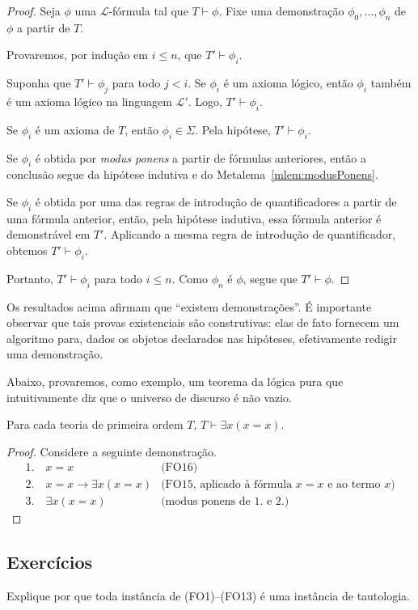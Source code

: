 \begin{proof}
    Seja $\phi$ uma $\mathcal L$-fórmula tal que $T\vdash \phi$.
    Fixe uma demonstração $\phi_0,\dots,\phi_n$ de $\phi$ a partir de $T$.

    Provaremos, por indução em $i\leq n$, que $T'\vdash \phi_i$.

    Suponha que $T'\vdash \phi_j$ para todo $j<i$.
    Se $\phi_i$ é um axioma lógico, então $\phi_i$ também é um axioma lógico na linguagem $\mathcal L'$.
    Logo, $T'\vdash \phi_i$.

    Se $\phi_i$ é um axioma de $T$, então $\phi_i\in\Sigma$.
    Pela hipótese, $T'\vdash \phi_i$.

    Se $\phi_i$ é obtida por \emph{modus ponens} a partir de fórmulas anteriores, então a conclusão segue da hipótese indutiva e do Metalema~\ref{mlem:modusPonens}.

    Se $\phi_i$ é obtida por uma das regras de introdução de quantificadores a partir de uma fórmula anterior, então, pela hipótese indutiva, essa fórmula anterior é demonstrável em $T'$.
    Aplicando a mesma regra de introdução de quantificador, obtemos $T'\vdash \phi_i$.

    Portanto, $T'\vdash \phi_i$ para todo $i\leq n$.
    Como $\phi_n$ é $\phi$, segue que $T'\vdash \phi$.
\end{proof}

Os resultados acima afirmam que ``existem demonstrações''.
É importante observar que tais provas existenciais são construtivas: elas de fato fornecem um algoritmo para, dados os objetos declarados nas hipóteses, efetivamente redigir uma demonstração.

Abaixo, provaremos, como exemplo, um teorema da lógica pura que intuitivamente diz que o universo de discurso é não vazio.

\begin{metaproposition}\label{mprop:universoNaoVazio}
    Para cada teoria de primeira ordem $T$, $T \vdash \exists x (x=x)$.
\end{metaproposition}
\begin{proof}
    Considere a seguinte demonstração.
    \begin{align*}
    1.\ & x=x
        & \text{(FO16)} \\
    2.\ & x=x \rightarrow \exists x(x=x)
        & \text{(FO15, aplicado à fórmula $x=x$ e ao termo $x$)} \\
    3.\ & \exists x(x=x)
        & \text{(modus ponens de 1. e 2.)}
    \end{align*}
\end{proof}

\subsection*{Exercícios}

\begin{exercise}
    Explique por que toda instância de (FO1)--(FO13) é uma instância de tautologia.
\end{exercise}
